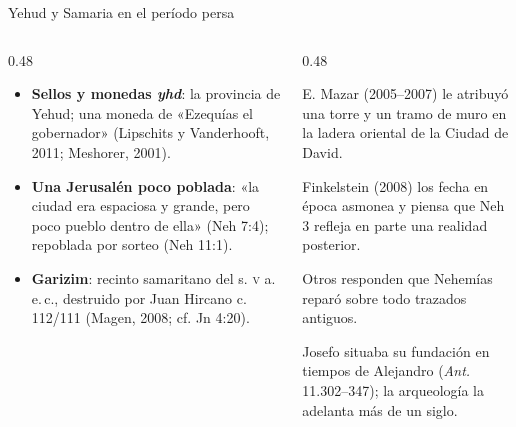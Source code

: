 \documentclass[hyperref={bookmarks=false},aspectratio=169]{beamer}
\begin{document}
\begin{frame}{Yehud y Samaria en el período persa}
\begin{columns}[T,onlytextwidth]
\begin{column}{0.48\textwidth}\footnotesize
\begin{itemize}
\item \textbf{Sellos y monedas \emph{yhd}}: la provincia de Yehud; una moneda de «Ezequías el gobernador» (Lipschits y Vanderhooft, 2011; Meshorer, 2001).\medskip
\item \textbf{Una Jerusalén poco poblada}: «la ciudad era espaciosa y grande, pero poco pueblo dentro de ella» (Neh 7:4); repoblada por sorteo (Neh 11:1).\medskip
\item \textbf{Garizim}: recinto samaritano del s. \textsc{v} a.\,e.\,c., destruido por Juan Hircano c. 112/111 (Magen, 2008; cf. Jn 4:20).
\end{itemize}
\end{column}
\begin{column}{0.48\textwidth}
\begin{notalam}
\footnotesize
E. Mazar (2005--2007) le atribuyó una torre y un tramo de muro en la ladera oriental de la Ciudad de David.\par\smallskip
Finkelstein (2008) los fecha en época asmonea y piensa que Neh 3 refleja en parte una realidad posterior.\par\smallskip
Otros responden que Nehemías reparó sobre todo trazados antiguos.
\end{notalam}
\begin{notalam}
\footnotesize Josefo situaba su fundación en tiempos de Alejandro (\emph{Ant.} 11.302--347); la arqueología la adelanta más de un siglo.
\end{notalam}
\end{column}
\end{columns}
\end{frame}
\end{document}
